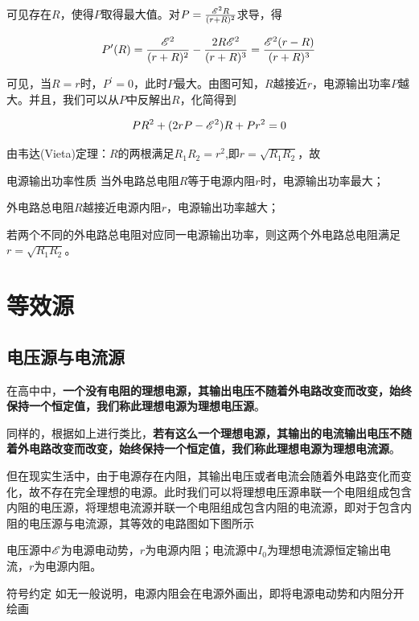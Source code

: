 可见存在$R$，使得$P$取得最大值。对$P = \frac{\mathscr{E}^2 R}{(r + R)^2}$求导，得

$$P^{\prime}(R) = \frac{\mathscr{E}^2}{(r+R)^2}-\frac{2 R \mathscr{E}^2}{(r+R)^3} = \frac{\mathscr{E}^2 (r-R)}{(r+R)^3}$$

可见，当$R=r$时，$P^{\prime} = 0$，此时$P$最大。由图可知，$R$越接近$r$，电源输出功率$P$越大。并且，我们可以从$P$中反解出$R$，化简得到

$$P R^2 + (2 r P - \mathscr{E}^2)R + P r^2 = 0$$

由韦达(Vieta)定理：$R$的两根满足$R_1 R_2 = r^2$,即$r = \sqrt{R_1 R_2}$，故

\begin{theo}{电源输出功率性质}{}
当外电路总电阻$R$等于电源内阻$r$时，电源输出功率最大；

外电路总电阻$R$越接近电源内阻$r$，电源输出功率越大；

若两个不同的外电路总电阻对应同一电源输出功率，则这两个外电路总电阻满足$r = \sqrt{R_1 R_2}$。
\end{theo}

\section{等效源}
\label{s_dxy}

\subsection{电压源与电流源}

在高中中，\textbf{一个没有电阻的理想电源，其输出电压不随着外电路改变而改变，始终保持一个恒定值，我们称此理想电源为理想电压源}。

同样的，根据如上进行类比，\textbf{若有这么一个理想电源，其输出的电流输出电压不随着外电路改变而改变，始终保持一个恒定值，我们称此理想电源为理想电流源}。

但在现实生活中，由于电源存在内阻，其输出电压或者电流会随着外电路变化而变化，故不存在完全理想的电源。此时我们可以将理想电压源串联一个电阻组成包含内阻的电压源，将理想电流源并联一个电阻组成包含内阻的电流源，即对于包含内阻的电压源与电流源，其等效的电路图如下图所示



电压源中$\mathscr{E}$为电源电动势，$r$为电源内阻；电流源中$I_0$为理想电流源恒定输出电流，$r$为电源内阻。

\begin{mk}{符号约定}{}
如无一般说明，电源内阻会在电源外画出，即将电源电动势和内阻分开绘画
\end{mk}

